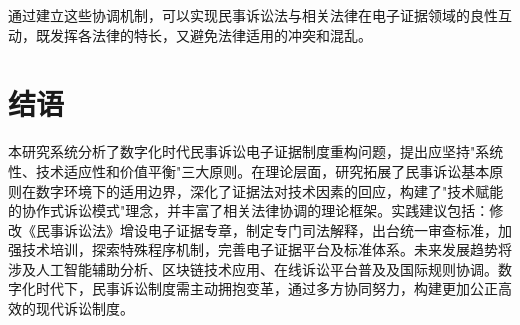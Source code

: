 通过建立这些协调机制，可以实现民事诉讼法与相关法律在电子证据领域的良性互动，既发挥各法律的特长，又避免法律适用的冲突和混乱。

\section{结语}

本研究系统分析了数字化时代民事诉讼电子证据制度重构问题，提出应坚持"系统性、技术适应性和价值平衡"三大原则。在理论层面，研究拓展了民事诉讼基本原则在数字环境下的适用边界，深化了证据法对技术因素的回应，构建了"技术赋能的协作式诉讼模式"理念，并丰富了相关法律协调的理论框架。实践建议包括：修改《民事诉讼法》增设电子证据专章，制定专门司法解释，出台统一审查标准，加强技术培训，探索特殊程序机制，完善电子证据平台及标准体系。未来发展趋势将涉及人工智能辅助分析、区块链技术应用、在线诉讼平台普及及国际规则协调。数字化时代下，民事诉讼制度需主动拥抱变革，通过多方协同努力，构建更加公正高效的现代诉讼制度。